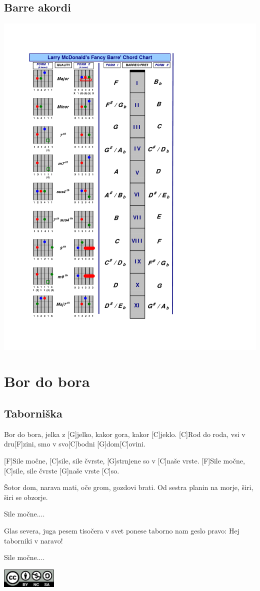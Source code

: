 \documentclass[a4paper,12pt]{article}
\begin{document}
\begin{multicols}{2}
\subsection*{Barre akordi}
\includegraphics[width=140mm]{img/barre.png}
\clearpage
\section{Bor do bora}
\subsection*{Taborniška}
\begin{guitar}
[C]Bor do bora, jelka z [G]jelko,
kakor gora, kakor [C]jeklo.
[C]Rod do roda, vsi v dru[F]zini,
smo v svo[C]bodni [G]dom[C]ovini.


[F]Sile močne, [C]sile, sile čvrste,   
[G]strnjene so v [C]naše vrste.
[F]Sile močne, [C]sile, sile čvrste
[G]naše vrste [C]so.


Šotor dom, narava mati,
oče grom, gozdovi brati.
Od sestra planin na morje,
širi, širi se obzorje.

          
Sile močne....


Glas severa, juga pesem 
tisočera v svet ponese
taborno nam geslo pravo:
Hej taborniki v naravo!

         
Sile močne....

\end{guitar}
\end{multicols}
\clearpage
\clearpage
\null
\vfill
\center
\includegraphics[width=100px]{img/licence.png}
\end{document}
